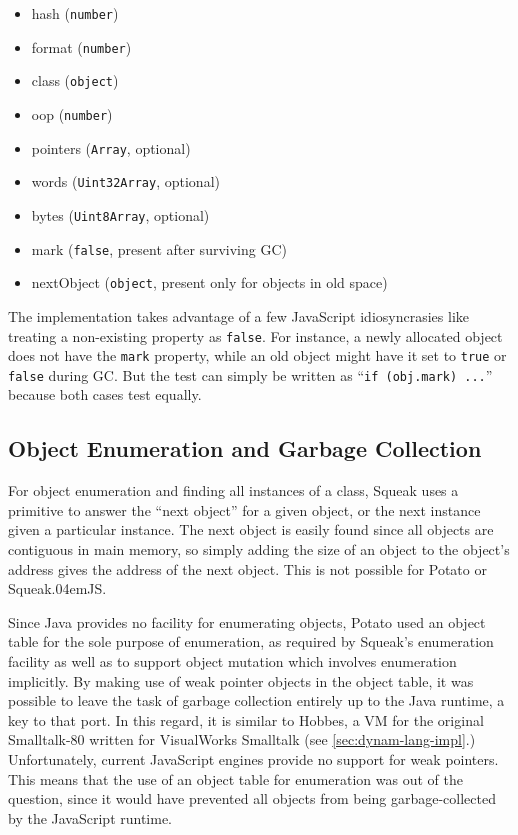 \documentclass[natbib]{sigplanconf}
\newcommand*\SqueakJS{Squeak\texorpdfstring{\kern.04em}{}JS\xspace}
\newcommand*\JS{JavaScript\xspace}
\begin{document}
\begin{itemize}
\item hash (\lstinline|number|)
\item format (\lstinline|number|)
\item class (\lstinline|object|)
\item oop (\lstinline|number|)
\item pointers (\lstinline|Array|, optional)
\item words (\lstinline|Uint32Array|, optional)
\item bytes (\lstinline|Uint8Array|, optional)
\item mark (\lstinline|false|, present after surviving \ac{GC})
\item nextObject (\lstinline|object|, present only for objects in old space)
\end{itemize}

The implementation takes advantage of a few \JS idiosyncrasies like treating
a non-existing property as \lstinline|false|. For instance, a newly allocated object
does not have the \lstinline|mark| property, while an old object might have it
set to \lstinline|true| or \lstinline|false| during \ac{GC}. But the test can
simply be written as ``\lstinline|if (obj.mark) ...|'' because both cases test
equally.

\subsection{Object Enumeration and Garbage Collection}

For object enumeration and finding all instances of a class, Squeak uses a
primitive to answer the ``next object'' for a given object, or the next
instance given a particular instance. The next object is easily found since
all objects are contiguous in main memory, so simply adding the size of an
object to the object's address gives the address of the next object. This is
not possible for Potato or \SqueakJS.

Since Java provides no facility for enumerating objects, Potato used
an object table for the sole purpose of enumeration, as required by
Squeak's enumeration facility as well as to support object mutation
which involves enumeration implicitly. By making use of weak pointer
objects in the object table, it was possible to leave the task of
garbage collection entirely up to the Java runtime, a key to that
port. In this regard, it is similar to Hobbes, a \ac{VM} for the
original Smalltalk-80 written for VisualWorks Smalltalk (see
\autoref{sec:dynam-lang-impl}.) Unfortunately, current \JS engines
provide no support for weak pointers. This means that the use of an
object table for enumeration was out of the question, since it would
have prevented all objects from being garbage-collected by the \JS
runtime.
\end{document}
